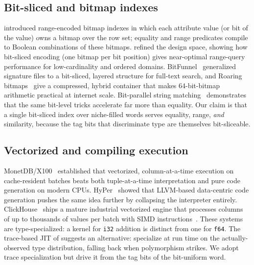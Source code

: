 \documentclass[10pt]{article}
\begin{document}
\subsection{Bit-sliced and bitmap indexes}
\citet{oneil1997improved} introduced range-encoded bitmap indexes in
which each attribute value (or bit of the value) owns a bitmap over the
row set; equality and range predicates compile to Boolean combinations
of these bitmaps. \citet{chan1998bitmap} refined the design space,
showing how bit-sliced encoding (one bitmap per bit position) gives
near-optimal range-query performance for low-cardinality and ordered
domains. BitFunnel~\citep{goodwin2017bitfunnel} generalized signature
files to a bit-sliced, layered structure for full-text search, and
Roaring bitmaps~\citep{chambi2016roaring} give a compressed, hybrid
container that makes 64-bit-bitmap arithmetic practical at internet
scale. Bit-parallel string matching~\citep{cantone2014bitparallel}
demonstrates that the same bit-level tricks accelerate far more than
equality. Our claim is that a single bit-sliced index over niche-filled
words serves equality, range, \emph{and} similarity, because the tag
bits that discriminate type are themselves bit-sliceable.

\subsection{Vectorized and compiling execution}
MonetDB/X100~\citep{boncz2005monetdb} established that vectorized,
column-at-a-time execution on cache-resident batches beats both
tuple-at-a-time interpretation and pure code generation on modern CPUs.
HyPer~\citep{neumann2011hyper} showed that LLVM-based data-centric code
generation pushes the same idea further by collapsing the interpreter
entirely. ClickHouse~\citep{schulze2024clickhouse} ships a mature
industrial vectorized engine that processes columns of up to thousands
of values per batch with SIMD
instructions~\citep{polychroniou2015arithmetic,willhalm2009simd}. These
systems are type-specialized: a kernel for \texttt{i32} addition is
distinct from one for \texttt{f64}. The trace-based JIT of
\citet{gal2009trace} suggests an alternative: specialize at run time on
the actually-observed type distribution, falling back when polymorphism
strikes. We adopt trace specialization but drive it from the tag bits
of the bit-uniform word.
\end{document}
